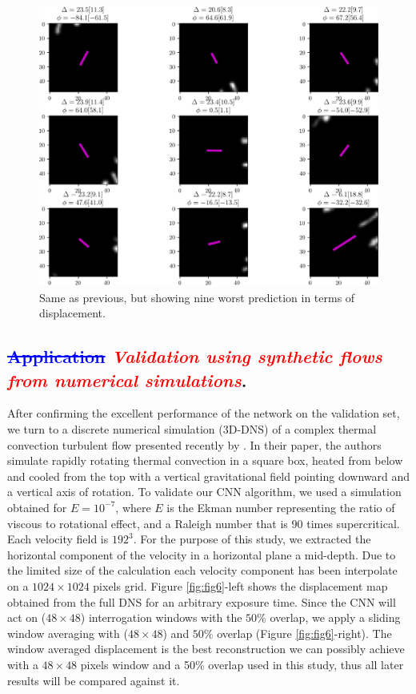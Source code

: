 \documentclass{svjour3}                     %
\newcommand{\new}[1]{\textit{\textcolor{red}{#1}}}
\newcommand{\old}[1]{\textcolor{blue}{\sout{#1}}}
\begin{document}
\begin{figure}
\includegraphics[width=\textwidth]{figs/figure4.png}
\caption{Same as previous, but showing nine worst prediction in terms of displacement.}
\label{fig:fig5}
\end{figure}

\subsection{\old{Application} \new{Validation using synthetic flows from numerical simulations}.}

After confirming the excellent performance of the network on the validation set, we turn to a discrete numerical simulation (3D-DNS) of a complex thermal convection turbulent flow presented recently by \cite{plumley2016effects}. In their paper, the authors simulate rapidly rotating thermal convection in a square box, heated from below and cooled from the top with a vertical gravitational field pointing downward and a vertical axis of rotation. To validate our CNN algorithm, we used a simulation obtained for $E=10^{-7}$, where $E$ is the Ekman number representing the ratio of viscous to rotational effect, and a Raleigh number that is 90 times supercritical. Each velocity field is $192^3$. For the purpose of this study, we extracted the horizontal component of the velocity in a horizontal plane a mid-depth. Due to the limited size of the calculation each velocity component has been interpolate on a $1024\times 1024$ pixels grid. 
Figure \ref{fig:fig6}-left shows the displacement map obtained from the full DNS for an arbitrary exposure time. Since the CNN will act on ($48\times48$) interrogation windows with the $50\%$ overlap, we apply a sliding window averaging with ($48\times48$) and $50\%$ overlap (Figure \ref{fig:fig6}-right). The window averaged displacement is the best reconstruction we can possibly achieve with a $48 \times 48$ pixels window and a 50\% overlap used in this study, thus all later results will be compared against it.
\end{document}
